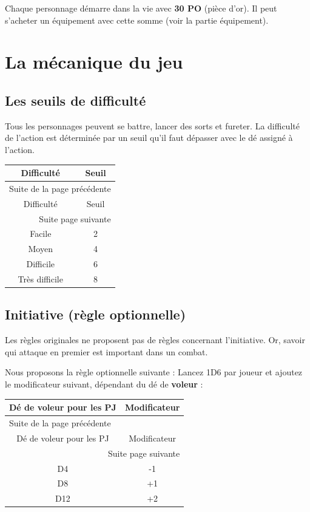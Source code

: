 \documentclass[a4paper, 11pt, twoside]{article}
\begin{document}
Chaque personnage démarre dans la vie avec \textbf{30 PO} (pièce d'or). Il peut s'acheter un équipement avec cette somme (voir la partie équipement).

\section{La mécanique du jeu}
\label{sec:org231e077}
\subsection{Les seuils de difficulté}
\label{sec:org551c4ca}
Tous les personnages peuvent se battre, lancer des sorts et fureter. La difficulté de l'action est déterminée par un seuil qu'il faut dépasser avec le dé assigné à l'action.

\begin{longtable}{c|c}
Difficulté & Seuil\\
\hline
\endfirsthead
\multicolumn{2}{l}{Suite de la page précédente} \\
\hline

Difficulté & Seuil \\

\hline
\endhead
\hline\multicolumn{2}{r}{Suite page suivante} \\
\endfoot
\endlastfoot
\hline
Facile & 2\\
Moyen & 4\\
Difficile & 6\\
Très difficile & 8\\
\end{longtable}

\subsection{Initiative (règle optionnelle)}
\label{sec:org7fbcd4c}

Les règles originales ne proposent pas de règles concernant l'initiative. Or, savoir qui attaque en premier est important dans un combat.

Nous proposons la règle optionnelle suivante : Lancez 1D6 par joueur et ajoutez le modificateur suivant, dépendant du dé de \textbf{voleur} :

\begin{longtable}{c|c}
Dé de voleur pour les PJ & Modificateur\\
\hline
\endfirsthead
\multicolumn{2}{l}{Suite de la page précédente} \\
\hline

Dé de voleur pour les PJ & Modificateur \\

\hline
\endhead
\hline\multicolumn{2}{r}{Suite page suivante} \\
\endfoot
\endlastfoot
\hline
D4 & -1\\
D8 & +1\\
D12 & +2\\
\end{longtable}
\end{document}
